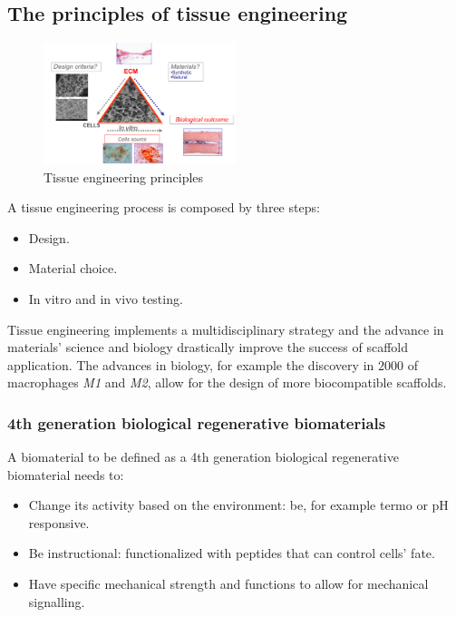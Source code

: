 	\subsection{The principles of tissue engineering}

	\begin{figure}[ht]
		\centering
		\includegraphics[width=0.5\textwidth]{triangolo.png}
		\caption{Tissue engineering principles}
		\label{fig:triangle}
	\end{figure}

	A tissue engineering process is composed by three steps:

	\begin{multicols}{3}
		\begin{itemize}
			\item Design.
			\item Material choice.
			\item In vitro and in vivo testing.
		\end{itemize}
	\end{multicols}

	Tissue engineering implements a multidisciplinary strategy and the advance in materials' science and biology drastically improve the success of scaffold application.
	The advances in biology, for example the discovery in $2000$ of macrophages \emph{M1} and \emph{M2}, allow for the design of more biocompatible scaffolds.


		\subsubsection{4th generation biological regenerative biomaterials}
		A biomaterial to be defined as a 4th generation biological regenerative biomaterial needs to:

		\begin{multicols}{2}
			\begin{itemize}
				\item Change its activity based on the environment: be, for example termo or pH responsive.
				\item Be instructional: functionalized with peptides that can control cells' fate.
				\item Have specific mechanical strength and functions to allow for mechanical signalling.
			\end{itemize}
		\end{multicols}

